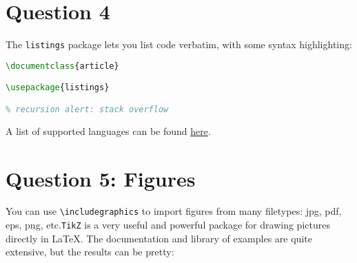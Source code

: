 \documentclass{article} %
\begin{document}
\section*{Question 4}
The \texttt{listings} package lets you list code verbatim, with some syntax highlighting:
\begin{lstlisting}[language=tex]
\documentclass{article}

\usepackage{listings}

% recursion alert: stack overflow
\end{lstlisting}
A list of supported languages can be found \href{https://en.wikibooks.org/wiki/LaTeX/Source_Code_Listings}{here}.


\section*{Question 5: Figures}
You can use \verb|\includegraphics| to import figures from many filetypes: jpg, pdf, eps, png, etc.\texttt{TikZ} is a very useful and powerful package for drawing pictures directly in \LaTeX.  The documentation and library of examples are quite extensive, but the results can be pretty:
\end{document}

